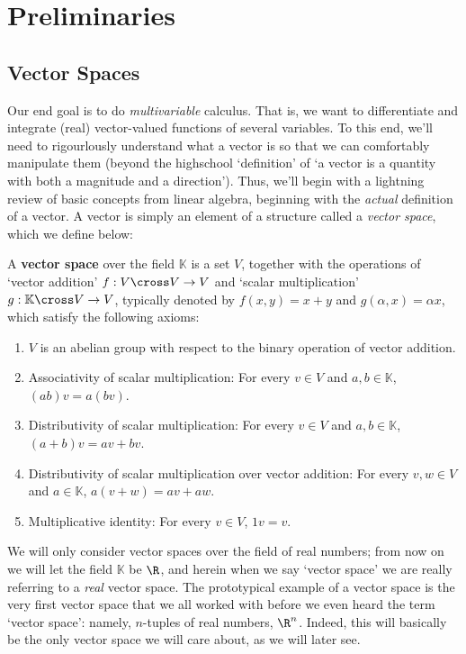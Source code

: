 
\chapter{Preliminaries}
\section{Vector Spaces}
Our end goal is to do \emph{multivariable} calculus. That is, we want to differentiate and integrate (real) vector-valued functions of several variables. To this end, we'll need to rigourlously understand what a vector is so that we can comfortably manipulate them (beyond the highschool `definition' of `a vector is a quantity with both a magnitude and a direction'). Thus, we'll begin with a lightning review of basic concepts from linear algebra, beginning with the \emph{actual} definition of a vector. A vector is simply an element of a structure called a \emph{vector space}, which we define below:
\begin{definition}
  A \textbf{vector space} over the field \( \mathbb{K} \) is a set \( V \), together with the operations of `vector addition' \( f:V\cross V\to V \) and `scalar multiplication' \(g:\mathbb{K}\cross V\to V  \), typically denoted by \(f(x,y)=x+y  \) and \( g(\alpha,x)=\alpha x \), which satisfy the following axioms:
  \begin{enumerate}[label=(\alph*)]
  \item \( V \) is an abelian group with respect to the binary operation of vector addition.
  \item Associativity of scalar multiplication: For every \( v\in V \) and \( a,b\in\mathbb{K} \), \( (ab)v=a(bv) \).
  \item Distributivity of scalar multiplication: For every \( v\in V \) and \( a,b\in\mathbb{K} \), \( (a+b)v=av+bv \).
  \item Distributivity of scalar multiplication over vector addition: For every \( v,w\in V \) and \( a\in\mathbb{K} \), \( a(v+w)=av+aw \).
  \item Multiplicative identity: For every \( v\in V \), \( 1v=v \).
  \end{enumerate}
\end{definition}

We will only consider vector spaces over the field of real numbers; from now on we will let the field \( \mathbb{K} \) be \( \R \), and herein when we say `vector space' we are really referring to a \emph{real} vector space. The prototypical example of a vector space is the very first vector space that we all worked with before we even heard the term `vector space': namely, \( n \)-tuples of real numbers, \( \R^n \). Indeed, this will basically be the only vector space we will care about, as we will later see.

